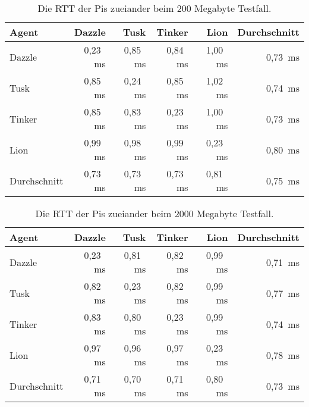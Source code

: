 \begin{table}
\centering
\begin{tabular}{l%
 r<{\,ms}%
 r<{\,ms}%
 r<{\,ms}%
 r<{\,ms}%
 r<{\,ms}%
}
Agent  				& \multicolumn{1}{r}{Dazzle}	& \multicolumn{1}{r}{Tusk}	& \multicolumn{1}{r}{Tinker}	& \multicolumn{1}{r}{Lion}	& \multicolumn{1}{r}{Durchschnitt}		\\
\hline
Dazzle 				& 0,23				& 0,85				& 0,84				& 1,00				& 0,73		\\
Tusk 				& 0,85				& 0,24				& 0,85				& 1,02				& 0,74		\\
Tinker				& 0,85				& 0,83				& 0,23				& 1,00				& 0,73		\\
Lion				& 0,99				& 0,98				& 0,99				& 0,23				& 0,80		\\ 
Durchschnitt			& 0,73				& 0,73				& 0,73 				& 0,81				& 0,75		\\
\end{tabular}
\caption{Die RTT der Pis zueiander beim 200 Megabyte Testfall.}
\label{tab:ping200}
\end{table}

\begin{table}
\centering
\begin{tabular}{l%
 r<{\,ms}%
 r<{\,ms}%
 r<{\,ms}%
 r<{\,ms}%
 r<{\,ms}%
}
Agent  				& \multicolumn{1}{r}{Dazzle}	& \multicolumn{1}{r}{Tusk}	& \multicolumn{1}{r}{Tinker}	& \multicolumn{1}{r}{Lion}	& \multicolumn{1}{r}{Durchschnitt}		\\
\hline
Dazzle 				& 0,23				& 0,81				& 0,82				& 0,99				& 0,71		\\
Tusk 				& 0,82				& 0,23				& 0,82				& 0,99				& 0,77		\\
Tinker				& 0,83				& 0,80				& 0,23				& 0,99				& 0,74		\\
Lion				& 0,97				& 0,96				& 0,97				& 0,23				& 0,78		\\ 
Durchschnitt			& 0,71				& 0,70				& 0,71 				& 0,80				& 0,73		\\
\end{tabular}
\caption{Die RTT der Pis zueiander beim 2000 Megabyte Testfall.}
\label{tab:ping2000}
\end{table}
